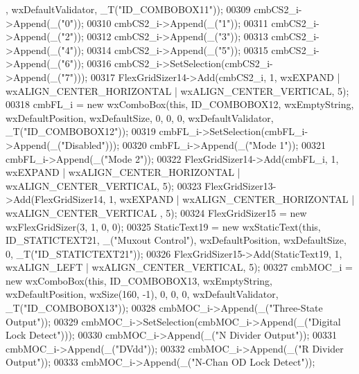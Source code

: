 \begin{DoxyCode}
      , wxDefaultValidator, \_T(\textcolor{stringliteral}{"ID\_COMBOBOX11"}));
00309     cmbCS2\_i->Append(\_(\textcolor{stringliteral}{"0"}));
00310     cmbCS2\_i->Append(\_(\textcolor{stringliteral}{"1"}));
00311     cmbCS2\_i->Append(\_(\textcolor{stringliteral}{"2"}));
00312     cmbCS2\_i->Append(\_(\textcolor{stringliteral}{"3"}));
00313     cmbCS2\_i->Append(\_(\textcolor{stringliteral}{"4"}));
00314     cmbCS2\_i->Append(\_(\textcolor{stringliteral}{"5"}));
00315     cmbCS2\_i->Append(\_(\textcolor{stringliteral}{"6"}));
00316     cmbCS2\_i->SetSelection(cmbCS2\_i->Append(\_(\textcolor{stringliteral}{"7"})));
00317     FlexGridSizer14->Add(cmbCS2\_i, 1, wxEXPAND | wxALIGN\_CENTER\_HORIZONTAL | wxALIGN\_CENTER\_VERTICAL, 5);
00318     cmbFL\_i = \textcolor{keyword}{new} wxComboBox(\textcolor{keyword}{this}, ID\_COMBOBOX12, wxEmptyString, wxDefaultPosition, wxDefaultSize, 0, 0, 0,
       wxDefaultValidator, \_T(\textcolor{stringliteral}{"ID\_COMBOBOX12"}));
00319     cmbFL\_i->SetSelection(cmbFL\_i->Append(\_(\textcolor{stringliteral}{"Disabled"})));
00320     cmbFL\_i->Append(\_(\textcolor{stringliteral}{"Mode 1"}));
00321     cmbFL\_i->Append(\_(\textcolor{stringliteral}{"Mode 2"}));
00322     FlexGridSizer14->Add(cmbFL\_i, 1, wxEXPAND | wxALIGN\_CENTER\_HORIZONTAL | wxALIGN\_CENTER\_VERTICAL, 5);
00323     FlexGridSizer13->Add(FlexGridSizer14, 1, wxEXPAND | wxALIGN\_CENTER\_HORIZONTAL | wxALIGN\_CENTER\_VERTICAL
      , 5);
00324     FlexGridSizer15 = \textcolor{keyword}{new} wxFlexGridSizer(3, 1, 0, 0);
00325     StaticText19 = \textcolor{keyword}{new} wxStaticText(\textcolor{keyword}{this}, ID\_STATICTEXT21, \_(\textcolor{stringliteral}{"Muxout Control"}), wxDefaultPosition, 
      wxDefaultSize, 0, \_T(\textcolor{stringliteral}{"ID\_STATICTEXT21"}));
00326     FlexGridSizer15->Add(StaticText19, 1, wxALIGN\_LEFT | wxALIGN\_CENTER\_VERTICAL, 5);
00327     cmbMOC\_i = \textcolor{keyword}{new} wxComboBox(\textcolor{keyword}{this}, ID\_COMBOBOX13, wxEmptyString, wxDefaultPosition, wxSize(160, -1), 0, 0,
       0, wxDefaultValidator, \_T(\textcolor{stringliteral}{"ID\_COMBOBOX13"}));
00328     cmbMOC\_i->Append(\_(\textcolor{stringliteral}{"Three-State Output"}));
00329     cmbMOC\_i->SetSelection(cmbMOC\_i->Append(\_(\textcolor{stringliteral}{"Digital Lock Detect"})));
00330     cmbMOC\_i->Append(\_(\textcolor{stringliteral}{"N Divider Output"}));
00331     cmbMOC\_i->Append(\_(\textcolor{stringliteral}{"DVdd"}));
00332     cmbMOC\_i->Append(\_(\textcolor{stringliteral}{"R Divider Output"}));
00333     cmbMOC\_i->Append(\_(\textcolor{stringliteral}{"N-Chan OD Lock Detect"}));

\end{DoxyCode}
